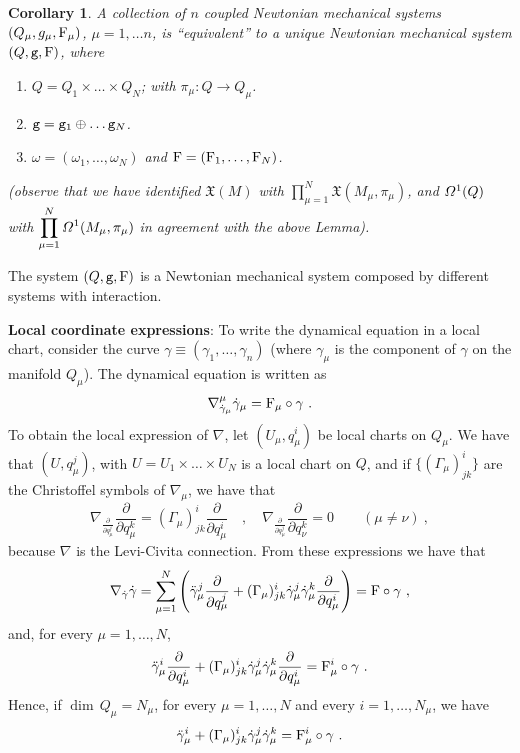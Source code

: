 \documentclass[12pt]{report}
\newtheorem{corol}[teor]{Corollary}
\def\beann{\begin{eqnarray*}}
\def\eeann{\end{eqnarray*}}
\def\ben{\begin{enumerate}}
\def\een{\end{enumerate}}
\def\dst{\displaystyle}
\def\derpar#1#2{\frac{\partial{#1}}{\partial{#2}}}
\def\moment#1#2#3{{#1}_{#2}, \ldots, {#1}_{#3}}
\def\vf{\mathfrak X}
\def\df{{\mit\Omega}}
\begin{document}
\begin{corol}
A collection of $n$ coupled Newtonian mechanical systems $(Q_\mu,g_\mu,{\rm F}_\mu)$, $\mu=1,\ldots n$, is ``equivalent'' to a unique Newtonian mechanical system $(Q,{\tt g},{\rm F})$, where
\ben
\item
$Q=Q_1\times\ldots\times Q_N$; with $\pi_\mu\colon Q\to Q_\mu$.
\item
${\tt g}={\tt g}_1\oplus\ldots {\tt g}_N$.
\item
$\omega=(\omega_1,\ldots ,\omega_N)$ and ${\rm F}=({\rm F}_1,\ldots ,{\rm F}_N)$.
\een
(observe that we have identified
$\vf (M)$ with \(\dst\prod_{\mu=1}^N\vf (M_\mu,\pi_\mu)\), and
$\df^1(Q)$ with \(\dst\prod_{\mu=1}^N\df^1 (M_\mu,\pi_\mu)\)
in agreement with the above Lemma).
\end{corol}

The system $(Q,{\tt g},{\rm F})$ is a Newtonian mechanical system composed by different systems with interaction.

{\bf Local coordinate expressions}:
To write the dynamical equation in a local chart, consider the curve $\gamma\equiv (\moment{\gamma}{1}{n})$
(where $\gamma_\mu$ is the component of $\gamma$ on the manifold $Q_\mu$). The dynamical equation is written as
$$
\nabla^\mu_{\dot\gamma_\mu}\dot\gamma_\mu={\rm F}_\mu\circ\gamma \ .
$$
To obtain the local expression of $\nabla$, let
$(U_\mu,q_\mu^i)$ be local charts on $Q_\mu$.
We have that $(U,q_\mu^j)$, with $U=U_1\times\ldots\times U_N$
is a local chart on $Q$, and if $\{ (\Gamma_\mu)_{jk}^i\}$
are the Christoffel symbols of $\nabla_\mu$,
we have that
$$
\nabla_{\derpar{}{q^j_\mu}}\derpar{}{q^k_\mu}=(\Gamma_\mu)_{jk}^i\derpar{}{q_\mu^i} \quad ,\quad
\nabla_{\derpar{}{q^j_\mu}}\derpar{}{q^k_\nu}=0
\qquad (\mu\not=\nu ) \ ,
$$
because $\nabla$ is the Levi-Civita connection. From these expressions we have that
$$
\nabla_{\dot\gamma}\dot\gamma=
\sum_{\mu=1}^N\left(\ddot\gamma_\mu^j\derpar{}{q^j_\mu}+
(\Gamma_\mu)_{jk}^i\dot\gamma_\mu^j\dot\gamma_\mu^k
\derpar{}{q^i_\mu}\right) =
{\rm F}\circ\gamma \ ,
$$
and, for every $\mu=1,\ldots ,N$,
$$
\ddot\gamma_\mu^i\derpar{}{q^i_\mu}+
(\Gamma_\mu)_{jk}^i\dot\gamma_\mu^j\dot\gamma_\mu^k\derpar{}{q^i_\mu}=
{\rm F}^i_\mu\circ\gamma \ .
$$
Hence,  if $\dim\, Q_\mu=N_{\mu}$, for every $\mu=1,\ldots ,N$
and every $i=1,\ldots ,N_{\mu}$, we have 
$$
\ddot\gamma_\mu^i+
(\Gamma_\mu)_{jk}^i\dot\gamma_\mu^j\dot\gamma_\mu^k =
{\rm F}_\mu^i\circ\gamma \ .
$$
\end{document}
